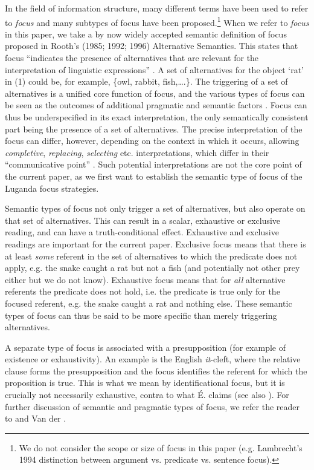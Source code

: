 \documentclass[output=paper]{langsci/langscibook}
\begin{document}
In the field of information structure, many different terms have been used to refer to \textit{focus} and many subtypes of focus have been proposed.\footnote{We do not consider the scope or size of focus in this paper (e.g. Lambrecht’s 1994 distinction between argument vs. predicate vs. sentence focus).}{} When we refer to \textit{focus} in this paper, we take a by now widely accepted semantic definition of focus proposed in Rooth’s (1985; 1992; 1996) Alternative Semantics. This states that focus “indicates the presence of alternatives that are relevant for the interpretation of linguistic expressions” \citep[6]{Krifka2007}. A set of alternatives for the object ‘rat’ in (1) could be, for example, \{owl, rabbit, fish,….\}. The triggering of a set of alternatives is a unified core function of focus, and the various types of focus can be seen as the outcomes of additional pragmatic and semantic factors \citep{ZimmermannOnea2011}. Focus can thus be underspecified in its exact interpretation, the only semantically consistent part being the presence of a set of alternatives. The precise interpretation of the focus can differ, however, depending on the context in which it occurs, allowing \textit{completive}, \textit{replacing}, \textit{selecting} etc. interpretations, which differ in their “communicative point” \citep[281]{Dik1997}. Such potential interpretations are not the core point of the current paper, as we first want to establish the semantic type of focus of the Luganda focus strategies. 

Semantic types of focus not only trigger a set of alternatives, but also operate on that set of alternatives. This can result in a scalar, exhaustive or exclusive reading, and can have a truth-conditional effect. Exhaustive and exclusive readings are important for the current paper. Exclusive focus means that there is at least \textit{some} referent in the set of alternatives to which the predicate does not apply, e.g. the snake caught a rat but not a fish (and potentially not other prey either but we do not know). Exhaustive focus means that for \textit{all} alternative referents the predicate does not hold, i.e. the predicate is true only for the focused referent, e.g. the snake caught a rat and nothing else. These semantic types of focus can thus be said to be more specific than merely triggering alternatives.

A separate type of focus is associated with a presupposition (for example of existence or exhaustivity). An example is the English \textit{it}-cleft, where the relative clause forms the presupposition and the focus identifies the referent for which the proposition is true. This is what we mean by identificational focus, but it is crucially not necessarily exhaustive, contra to what É. \citet{Kiss1998} claims (see also \citealt{OneaBeaver2011,ByramWashburn2013,DestruelEtAl2014}). For further discussion of semantic and pragmatic types of focus, we refer the reader to \citet{Bazalgette2015} and Van der \citet{Wal2016}.  
\end{document}

